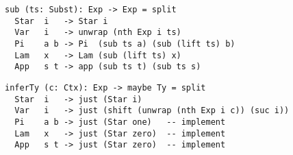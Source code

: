 \documentclass{article}
\begin{document}
\begin{lstlisting}[mathescape=true]
sub (ts: Subst): Exp -> Exp = split
  Star  i   -> Star i
  Var   i   -> unwrap (nth Exp i ts)
  Pi    a b -> Pi  (sub ts a) (sub (lift ts) b)
  Lam   x   -> Lam (sub (lift ts) x)
  App   s t -> app (sub ts t) (sub ts s)
\end{lstlisting}

\begin{lstlisting}[mathescape=true]
inferTy (c: Ctx): Exp -> maybe Ty = split
  Star  i   -> just (Star i)
  Var   i   -> just (shift (unwrap (nth Exp i c)) (suc i))
  Pi    a b -> just (Star one)   -- implement
  Lam   x   -> just (Star zero)  -- implement
  App   s t -> just (Star zero)  -- implement
\end{lstlisting}




\end{document}

